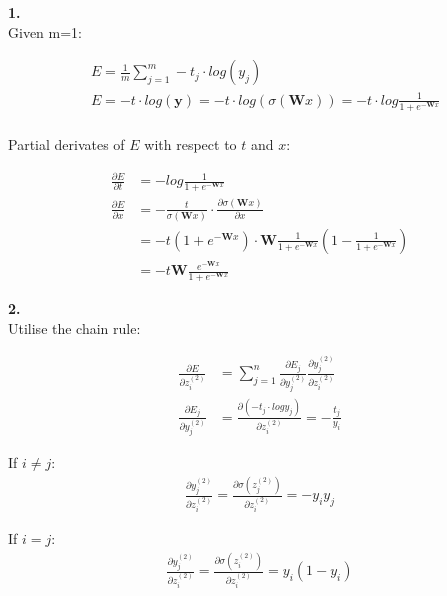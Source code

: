 \documentclass{article}
\begin{document}
\textbf{1.}\\

Given m=1:

\begin{equation}
\begin{aligned}
&E=\frac{1}{m}\sum^m_{j=1}-t_j\cdot log(y_j)\\
&E=-t\cdot log(\mathbf{y})=-t\cdot log(\sigma(\mathbf{W}x))=-t\cdot log\frac{1}{1+e^{-\mathbf{W}x}}\\
\end{aligned}
\end{equation}

Partial derivates of $E$ with respect to $t$ and $x$:

\begin{equation}
\begin{aligned}
\frac{\partial E}{\partial t}&=-log\frac{1}{1+e^{-\mathbf{W}x}}\\
\frac{\partial E}{\partial x}&=-\frac{t}{\sigma(\mathbf{W}x)}\cdot \frac{\partial \sigma(\mathbf{W}x)}{\partial x}\\
&=-t(1+e^{-\mathbf{W}x})\cdot \mathbf{W}\frac{1}{1+e^{-\mathbf{W}x}}(1-\frac{1}{1+e^{-\mathbf{W}x}})\\
&=-t\mathbf{W}\frac{e^{-\mathbf{W}x}}{1+e^{-\mathbf{W}x}}
\end{aligned}
\end{equation}

\textbf{2.}\\

Utilise the chain rule:

\begin{equation}
\begin{aligned}
\frac{\partial E}{\partial z_i^{(2)}}&=\sum^n_{j=1}\frac{\partial E_j}{\partial y_j^{(2)}}\frac{\partial y_j^{(2)}}{\partial z_i^{(2)}}\\
\frac{\partial E_j}{\partial y_j^{(2)}}&=\frac{\partial(-t_j\cdot log y_j)}{\partial z_i^{(2)}}=-\frac{t_j}{y_i}
\label{21}
\end{aligned}
\end{equation}

If $i\neq j$:
\begin{equation}
\begin{aligned}
\frac{\partial y_j^{(2)}}{\partial z_i^{(2)}}=\frac{\partial \sigma(z_j^{(2)})}{\partial z_i^{(2)}}=-y_iy_j
\label{22}
\end{aligned}
\end{equation}

If $i=j$:
\begin{equation}
\begin{aligned}
\frac{\partial y_j^{(2)}}{\partial z_i^{(2)}}=\frac{\partial \sigma(z_i^{(2)})}{\partial z_i^{(2)}}=y_i(1-y_i)
\label{23}
\end{aligned}
\end{equation}
\end{document}
